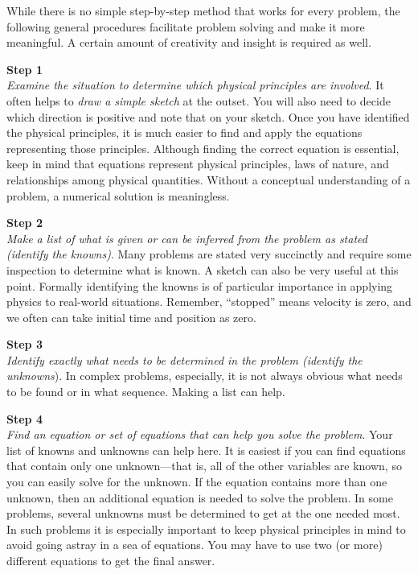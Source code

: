 \documentclass[main-ap-physics.tex]{subfiles}
\begin{document}
While there is no simple step-by-step method that works for every problem, the following general procedures facilitate problem solving and make it more meaningful. A certain amount of creativity and insight is required as well.

\vspace{1em}

\textbf{Step 1}\\
\textit{Examine the situation to determine which physical principles are involved}. It often helps to \textit{draw a simple sketch} at the outset. You will also need to decide which direction is positive and note that on your sketch. Once you have identified the physical principles, it is much easier to find and apply the equations representing those principles. Although finding the correct equation is essential, keep in mind that equations represent physical principles, laws of nature, and relationships among physical quantities. Without a conceptual understanding of a problem, a numerical solution is meaningless.

\vspace{1em}

\textbf{Step 2}\\
\textit{Make a list of what is given or can be inferred from the problem as stated (identify the knowns)}. Many problems are stated very succinctly and require some inspection to determine what is known. A sketch can also be very useful at this point. Formally identifying the knowns is of particular importance in applying physics to real-world situations. Remember, ``stopped'' means velocity is zero, and we often can take initial time and position as zero.

\vspace{1em}

\textbf{Step 3}\\
\textit{Identify exactly what needs to be determined in the problem (identify the unknowns}). In complex problems, especially, it is not always obvious what needs to be found or in what sequence. Making a list can help.

\vspace{1em}

\textbf{Step 4}\\
\textit{Find an equation or set of equations that can help you solve the problem}. Your list of knowns and unknowns can help here. It is easiest if you can find equations that contain only one unknown---that is, all of the other variables are known, so you can easily solve for the unknown. If the equation contains more than one unknown, then an additional equation is needed to solve the problem. In some problems, several unknowns must be determined to get at the one needed most. In such problems it is especially important to keep physical principles in mind to avoid going astray in a sea of equations. You may have to use two (or more) different equations to get the final answer.
\end{document}
